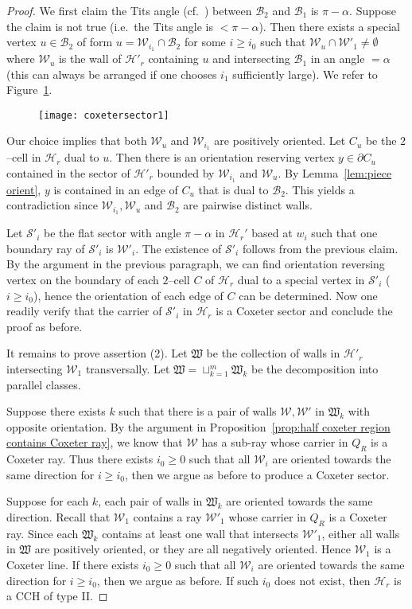 \documentclass[11pt]{amsart}
\newcommand {\B}{\mathcal B}
\newcommand {\h}{\mathcal H}
\newcommand {\W}{\mathcal W}
\newcommand {\s}{\mathcal S}
\theoremstyle{definition}
\begin{document}
\begin{proof}
	 We first claim the Tits angle (cf.\ \cite[Definition II.9.4]{BridsonHaefliger1999}) between $\B_2$ and $\B_1$ is $\pi-\alpha$. Suppose the claim is not true (i.e.\ the Tits angle is $<\pi-\alpha$). Then there exists a special vertex $u\in\B_2$ of form $u=\W_{i_1}\cap\B_2$ for some $i\ge i_0$ such that $\W_u\cap\W'_1\neq\emptyset$ where $\W_u$ is the wall of $\h'_r$ containing $u$ and intersecting $\B_1$ in an angle $=\alpha$ (this can always be arranged if one chooses $i_1$ sufficiently large). We refer to Figure~\ref{f:coxetersector1}.
	\begin{figure}[h!]
		\centering
		\texttt{[image: coxetersector1]}
		\caption{}
		\label{f:coxetersector1}
	\end{figure}
	Our choice implies that both $\W_u$ and $\W_{i_1}$ are positively oriented. Let $C_u$ be the $2$--cell in $\h_r$ dual to $u$. Then there is an orientation reserving vertex $y\in \partial C_u$ contained in the sector of $\h'_r$ bounded by $\W_{i_1}$ and $\W_u$. By Lemma~\ref{lem:piece orient}, $y$ is contained in an edge of $C_u$ that is dual to $\B_2$. This yields a contradiction since $\W_{i_1},\W_u$ and $\B_2$ are pairwise distinct walls. 
	
	Let $\s'_i$ be the flat sector with angle $\pi-\alpha$ in $\h_r'$ based at $w_i$ such that one boundary ray of $\s'_i$ is $\W'_i$. The existence of $\s'_i$ follows from the previous claim. By the argument in the previous paragraph, we can find orientation reversing vertex on the boundary of each $2$--cell $C$ of $\h_r$ dual to a special vertex in $\s'_i$ ($i\ge i_0$), hence the orientation of each edge of $C$ can be determined. Now one readily verify that the carrier of $\s'_i$ in $\h_r$ is a Coxeter sector and conclude the proof as before.
	
	It remains to prove assertion (2). Let $\mathfrak{W}$ be the collection of walls in $\h'_r$ intersecting $\W_1$ transversally. Let $\mathfrak{W}=\sqcup_{k=1}^m\mathfrak{W}_k$ be the decomposition into parallel classes. 
	
	Suppose there exists $k$ such that there is a pair of walls $\W,\W'$ in $\mathfrak{W}_k$ with opposite orientation. By the argument in Proposition~\ref{prop:half coxeter region contains Coxeter ray}, we know that $\W$ has a sub-ray whose carrier in $Q_R$ is a Coxeter ray. Thus there exists $i_0\ge 0$ such that all $\W_i$ are oriented towards the same direction for $i\ge i_0$, then we argue as before to produce a Coxeter sector.
	
	Suppose for each $k$, each pair of walls in $\mathfrak{W}_k$ are oriented towards the same direction. Recall that $\W_1$ contains a ray $\W'_1$ whose carrier in $Q_R$ is a Coxeter ray. Since each $\mathfrak{W}_k$ contains at least one wall that intersects $\W'_1$, either all walls in $\mathfrak{W}$ are positively oriented, or they are all negatively oriented. Hence $\W_1$ is a Coxeter line. If there exists $i_0\ge 0$ such that all $\W_i$ are oriented towards the same direction for $i\ge i_0$, then we argue as before. If such $i_0$ does not exist, then $\h_r$ is a CCH of type II.
\end{proof}
\end{document}
